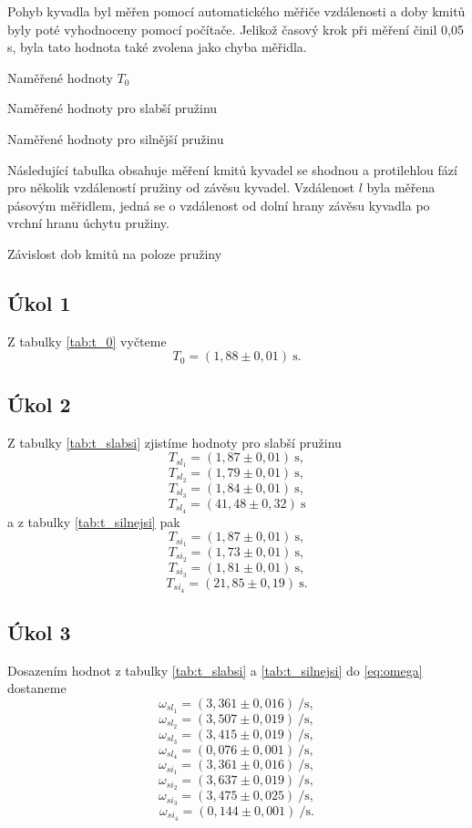 \documentclass[protokol.tex]{subfiles}
\begin{document}
Pohyb kyvadla byl měřen pomocí automatického měřiče vzdálenosti a doby kmitů byly poté vyhodnoceny pomocí počítače. Jelikož časový krok při měření činil 0,05 s, byla tato hodnota také zvolena jako chyba měřidla.
\begin{table}[H] 
\centering
\setlength{\tabcolsep}{15pt}

\caption{Naměřené hodnoty $T_0$}
\label{tab:t_0}
\end{table}

\begin{table}[H] 
\centering
\setlength{\tabcolsep}{15pt}

\caption{Naměřené hodnoty pro slabší pružinu}
\label{tab:t_slabsi}
\end{table}

\begin{table}[H] 
\centering
\setlength{\tabcolsep}{15pt}

\caption{Naměřené hodnoty pro silnější pružinu}
\label{tab:t_silnejsi}
\end{table}

Následující tabulka obsahuje měření kmitů kyvadel se shodnou a protilehlou fází pro několik vzdáleností pružiny od závěsu kyvadel. Vzdálenost $l$ byla měřena pásovým měřidlem, jedná se o vzdálenost od dolní hrany závěsu kyvadla po vrchní hranu úchytu pružiny.
\begin{table}[H] 
\centering
\setlength{\tabcolsep}{15pt}

\caption{Závislost dob kmitů na poloze pružiny}
\label{tab:t_vazba}
\end{table}

\subsection*{Úkol 1}
Z tabulky \ref{tab:t_0} vyčteme 
$$ T_0 = (1,88 \pm 0,01) \ \si{\second}. $$

\subsection*{Úkol 2}
Z tabulky \ref{tab:t_slabsi} zjistíme hodnoty pro slabší pružinu
$$T_{sl_1} = (1,87 \pm 0,01) \ \si{\second},$$
$$T_{sl_2} = (1,79 \pm 0,01) \ \si{\second},$$
$$T_{sl_3} = (1,84 \pm 0,01) \ \si{\second},$$
$$T_{sl_4} = (41,48 \pm 0,32) \ \si{\second}$$
a z tabulky \ref{tab:t_silnejsi} pak
$$T_{si_1} = (1,87 \pm 0,01) \ \si{\second},$$
$$T_{si_2} = (1,73 \pm 0,01) \ \si{\second},$$
$$T_{si_3} = (1,81 \pm 0,01) \ \si{\second},$$
$$T_{si_4} = (21,85 \pm 0,19) \ \si{\second}.$$

\subsection*{Úkol 3}
Dosazením hodnot z tabulky \ref{tab:t_slabsi} a \ref{tab:t_silnejsi} do \eqref{eq:omega} dostaneme
$$ \omega_{sl_1} = (3,361 \pm 0,016) \ \si{\per\second}, $$
$$ \omega_{sl_2} = (3,507 \pm 0,019) \ \si{\per\second}, $$
$$ \omega_{sl_3} = (3,415 \pm 0,019) \ \si{\per\second}, $$
$$ \omega_{sl_4} = (0,076 \pm 0,001) \ \si{\per\second}, $$
$$ \omega_{si_1} = (3,361 \pm 0,016) \ \si{\per\second}, $$
$$ \omega_{si_2} = (3,637 \pm 0,019) \ \si{\per\second}, $$
$$ \omega_{si_3} = (3,475 \pm 0,025) \ \si{\per\second}, $$
$$ \omega_{si_4} = (0,144 \pm 0,001) \ \si{\per\second}. $$
\end{document}
